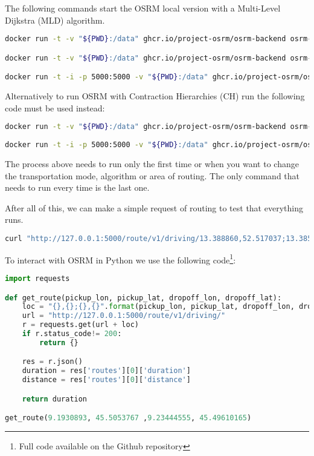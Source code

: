 \documentclass[12pt]{article}
\begin{document}
The following commands start the OSRM local version with a     Multi-Level Dijkstra (MLD) algorithm.
\begin{lstlisting}[language=bash, breaklines=true]
docker run -t -v "${PWD}:/data" ghcr.io/project-osrm/osrm-backend osrm-partition /data/nord-ovest-latest.osrm || "osrm-partition failed"

docker run -t -v "${PWD}:/data" ghcr.io/project-osrm/osrm-backend osrm-customize /data/nord-ovest-latest.osrm || "osrm-customize failed"

docker run -t -i -p 5000:5000 -v "${PWD}:/data" ghcr.io/project-osrm/osrm-backend osrm-routed --algorithm mld /data/nord-ovest-latest.osrm
\end{lstlisting}

Alternatively to run OSRM with Contraction Hierarchies (CH) run the following code must be used instead:
\begin{lstlisting}[language=bash, breaklines=true]
docker run -t -v "${PWD}:/data" ghcr.io/project-osrm/osrm-backend osrm-contract /data/nord-ovest-latest.osrm || "osrm-partition failed"
	
docker run -t -i -p 5000:5000 -v "${PWD}:/data" ghcr.io/project-osrm/osrm-backend osrm-routed --algorithm ch /data/nord-ovest-latest.osrm
\end{lstlisting}
The process above needs to run only the first time or when you want to change the transportation mode, algorithm or area of routing. The only command that needs to run every time is the last one.

After all of this, we can make a simple request of routing to test that everything runs.
\begin{lstlisting}[language=bash, breaklines=true]
curl "http://127.0.0.1:5000/route/v1/driving/13.388860,52.517037;13.385983,52.496891?steps=true"
\end{lstlisting}

To interact with OSRM in Python we use the following code\footnote{Full code available on the Github repository}:
\begin{lstlisting}[language=python, breaklines=true]
import requests

def get_route(pickup_lon, pickup_lat, dropoff_lon, dropoff_lat):
    loc = "{},{};{},{}".format(pickup_lon, pickup_lat, dropoff_lon, dropoff_lat)
    url = "http://127.0.0.1:5000/route/v1/driving/"
    r = requests.get(url + loc)
    if r.status_code!= 200:
        return {}

    res = r.json()
    duration = res['routes'][0]['duration']
    distance = res['routes'][0]['distance']

    return duration

get_route(9.1930893, 45.5053767	,9.23444555, 45.49610165)
\end{lstlisting}
\end{document}
